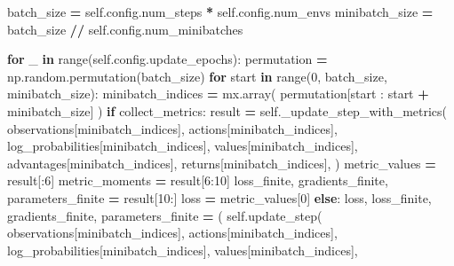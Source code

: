 \documentclass[
  chinese,
  11pt,
  letterpaper,
]{article}
\newenvironment{Shaded}{\begin{snugshade}}{\end{snugshade}}
\newcommand{\BuiltInTok}[1]{#1}
\newcommand{\ControlFlowTok}[1]{\textcolor[rgb]{0.13,0.29,0.53}{\textbf{#1}}}
\newcommand{\DecValTok}[1]{\textcolor[rgb]{0.00,0.00,0.81}{#1}}
\newcommand{\KeywordTok}[1]{\textcolor[rgb]{0.13,0.29,0.53}{\textbf{#1}}}
\newcommand{\NormalTok}[1]{#1}
\newcommand{\OperatorTok}[1]{\textcolor[rgb]{0.81,0.36,0.00}{\textbf{#1}}}
\newcommand{\VariableTok}[1]{\textcolor[rgb]{0.00,0.00,0.00}{#1}}
\renewenvironment{Shaded}{\par\smallskip}{\par\smallskip}
\begin{document}
\begin{Shaded}
\begin{Highlighting}[]
\NormalTok{        batch\_size }\OperatorTok{=} \VariableTok{self}\NormalTok{.config.num\_steps }\OperatorTok{*} \VariableTok{self}\NormalTok{.config.num\_envs}
\NormalTok{        minibatch\_size }\OperatorTok{=}\NormalTok{ batch\_size }\OperatorTok{//} \VariableTok{self}\NormalTok{.config.num\_minibatches}

        \ControlFlowTok{for}\NormalTok{ \_ }\KeywordTok{in} \BuiltInTok{range}\NormalTok{(}\VariableTok{self}\NormalTok{.config.update\_epochs):}
\NormalTok{            permutation }\OperatorTok{=}\NormalTok{ np.random.permutation(batch\_size)}
            \ControlFlowTok{for}\NormalTok{ start }\KeywordTok{in} \BuiltInTok{range}\NormalTok{(}\DecValTok{0}\NormalTok{, batch\_size, minibatch\_size):}
\NormalTok{                minibatch\_indices }\OperatorTok{=}\NormalTok{ mx.array(}
\NormalTok{                    permutation[start : start }\OperatorTok{+}\NormalTok{ minibatch\_size]}
\NormalTok{                )}
                \ControlFlowTok{if}\NormalTok{ collect\_metrics:}
\NormalTok{                    result }\OperatorTok{=} \VariableTok{self}\NormalTok{.\_update\_step\_with\_metrics(}
\NormalTok{                        observations[minibatch\_indices],}
\NormalTok{                        actions[minibatch\_indices],}
\NormalTok{                        log\_probabilities[minibatch\_indices],}
\NormalTok{                        values[minibatch\_indices],}
\NormalTok{                        advantages[minibatch\_indices],}
\NormalTok{                        returns[minibatch\_indices],}
\NormalTok{                    )}
\NormalTok{                    metric\_values }\OperatorTok{=}\NormalTok{ result[:}\DecValTok{6}\NormalTok{]}
\NormalTok{                    metric\_moments }\OperatorTok{=}\NormalTok{ result[}\DecValTok{6}\NormalTok{:}\DecValTok{10}\NormalTok{]}
\NormalTok{                    loss\_finite, gradients\_finite, parameters\_finite }\OperatorTok{=}\NormalTok{ result[}\DecValTok{10}\NormalTok{:]}
\NormalTok{                    loss }\OperatorTok{=}\NormalTok{ metric\_values[}\DecValTok{0}\NormalTok{]}
                \ControlFlowTok{else}\NormalTok{:}
\NormalTok{                    loss, loss\_finite, gradients\_finite, parameters\_finite }\OperatorTok{=}\NormalTok{ (}
                        \VariableTok{self}\NormalTok{.update\_step(}
\NormalTok{                            observations[minibatch\_indices],}
\NormalTok{                            actions[minibatch\_indices],}
\NormalTok{                            log\_probabilities[minibatch\_indices],}
\NormalTok{                            values[minibatch\_indices],}

\end{Highlighting}
\end{Shaded}
\end{document}

